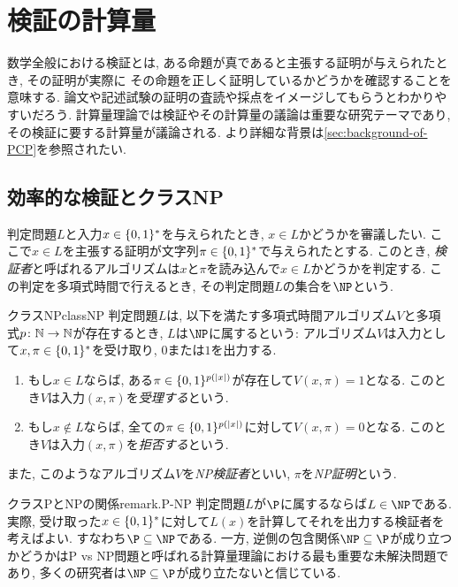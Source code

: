 \section{検証の計算量} \label{sec:verification-complexity}
数学全般における検証とは, ある命題が真であると主張する証明が与えられたとき, その証明が実際に
その命題を正しく証明しているかどうかを確認することを意味する.
論文や記述試験の証明の査読や採点をイメージしてもらうとわかりやすいだろう.
計算量理論では検証やその計算量の議論は重要な研究テーマであり, その検証に要する計算量が議論される.
より詳細な背景は\cref{sec:background-of-PCP}を参照されたい.


\subsection{効率的な検証とクラスNP}
判定問題$L$と入力$x\in\{0,1\}^*$を与えられたとき, $x\in L$かどうかを審議したい.
ここで$x\in L$を主張する証明が文字列$\pi\in\{0,1\}^*$で与えられたとする.
このとき, \emph{検証者}と呼ばれるアルゴリズムは$x$と$\pi$を読み込んで$x\in L$かどうかを判定する.
この判定を多項式時間で行えるとき, その判定問題$L$の集合を$\NP$という.

\begin{definition}{クラスNP}{classNP}
  判定問題$L$は, 以下を満たす多項式時間アルゴリズム$V$と多項式$p\colon\mathbb{N}\to\mathbb{N}$が存在するとき, $L$は$\NP$に属するという:
  アルゴリズム$V$は入力として$x,\pi\in\{0,1\}^*$を受け取り, $0$または$1$を出力する.
  \begin{enumerate}
  \item もし$x\in L$ならば, ある$\pi\in\{0,1\}^{p(\abs{x})}$が存在して$V(x,\pi)=1$となる. このとき$V$は入力$(x,\pi)$を\emph{受理する}という.
  \item もし$x\notin L$ならば, 全ての$\pi\in\{0,1\}^{p(\abs{x})}$に対して$V(x,\pi)=0$となる. このとき$V$は入力$(x,\pi)$を\emph{拒否する}という.
  \end{enumerate}
  また, このようなアルゴリズム$V$を\emph{NP検証者}といい, $\pi$を\emph{NP証明}という.
\end{definition}



\begin{remark}{クラスPとNPの関係}{remark.P-NP}
  判定問題$L$が$\P$に属するならば$L\in\NP$である.
  実際, 受け取った$x\in\{0,1\}^*$に対して$L(x)$を計算してそれを出力する検証者を考えばよい.
  すなわち$\P\subseteq\NP$である.
  一方, 逆側の包含関係$\NP\subseteq\P$が成り立つかどうかはP vs NP問題と呼ばれる計算量理論における最も重要な未解決問題であり, 多くの研究者は$\NP\subseteq\P$が成り立たないと信じている.
\end{remark}


